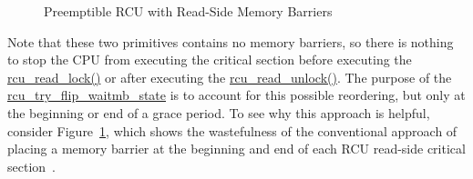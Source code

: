 \begin{figure}[htb]
\begin{center}
\end{center}
\caption{Preemptible RCU with Read-Side Memory Barriers}
\label{app:rcuimpl:Preemptible RCU with Read-Side Memory Barriers}
\end{figure}

Note that these two primitives contains no memory barriers, so there is
nothing to stop the CPU from executing the critical section
before executing the \url{rcu_read_lock()} or after executing
the \url{rcu_read_unlock()}.
The purpose of the \url{rcu_try_flip_waitmb_state} is to
account for this possible reordering, but only at the beginning or end of
a grace period.
To see why this approach is helpful, consider
Figure~\ref{app:rcuimpl:Preemptible RCU with Read-Side Memory Barriers},
which shows the wastefulness of the conventional approach of placing
a memory barrier at the beginning and end of each RCU read-side critical
section~\cite{PaulEMcKenney2006b}.

